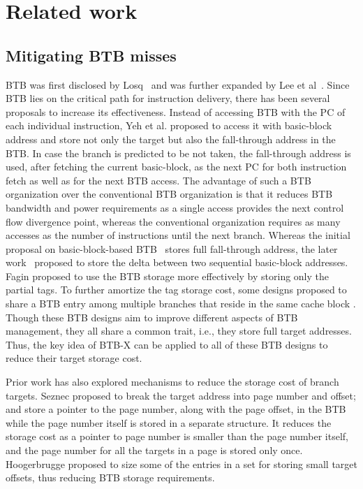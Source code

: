 \section{Related work}
\label{sec:related}

\subsection{Mitigating BTB misses}
BTB was first disclosed by Losq~\cite{losq} and was further expanded by Lee et al~\cite{btb}. Since BTB lies on the critical path for instruction delivery, there has been several proposals to increase its effectiveness. Instead of accessing BTB with the PC of each individual instruction, Yeh et al. \cite{bbtb} proposed to access it with basic-block address and store not only the target but also the fall-through address in the BTB. In case the branch is predicted to be not taken, the fall-through address is used, after fetching the current basic-block, as the next PC for both instruction fetch as well as for the next BTB access. The advantage of such a BTB organization over the conventional BTB organization is that it reduces BTB bandwidth and power requirements as a single access provides the next control flow divergence point, whereas the conventional organization requires as many accesses as the number of instructions until the next branch. Whereas the initial proposal on basic-block-based BTB~\cite{bbtb} stores full fall-through address, the later work~\cite{fbtb} proposed to store the delta between two sequential basic-block addresses. Fagin \cite{fagin1997partial} proposed to use the BTB storage more effectively by storing only the partial tags. To further amortize the tag storage cost, some designs proposed to share a BTB entry among multiple branches that reside in the same cache block \cite{amdbtb, confluence}. Though these BTB designs aim to improve different aspects of BTB management, they all share a common trait, i.e., they store full target addresses. Thus, the key idea of BTB-X can be applied to all of these BTB designs to reduce their target storage cost.

Prior work \cite{DUPN, ittage, jan, pdede, btbxCAL, btbxPACT} has also explored mechanisms to reduce the storage cost of branch targets. Seznec \cite{DUPN, ittage} proposed to break the target address into page number and offset; and store a pointer to the page number, along with the page offset, in the BTB while the page number itself is stored in a separate structure. It reduces the storage cost as a pointer to page number is smaller than the page number itself, and the page number for all the targets in a page is stored only once. Hoogerbrugge \cite{jan} proposed to size some of the entries in a set for storing small target offsets, thus reducing BTB storage requirements. 


